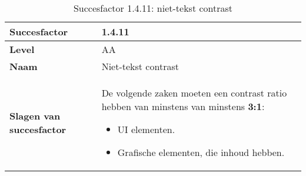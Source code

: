 \begin{table}[H]
    \centering
    \caption{Succesfactor 1.4.11: niet-tekst contrast}

        
        \hspace*{-1cm}\begin{tabular}{|l|p{12cm}|} 
            \hline
            \textbf{Succesfactor}                 & 1.4.11                                                                                                                                                                                                                                                                                                                                                                                                                                                                                                          \\ 
            \hline
            \textbf{Level}                        & AA                                                                                                                                                                                                                                                                                                                                                                                                                                                                                                                 \\ 
            \hline
            \textbf{Naam}                         & Niet-tekst contrast~                                                                                                                                                                                                                                                                                                                                                                                                                                                                                      \\ 
            \hline
            \textbf{Slagen van succesfactor}      & De volgende zaken moeten een contrast ratio hebben van minstens van minstens \textbf{3:1}: \begin{itemize}
                \item UI elementen.
                 \item Grafische elementen, die inhoud hebben.
            \end{itemize}                                                                                                                                                                                  \\ 

\end{tabular}
\end{table}
